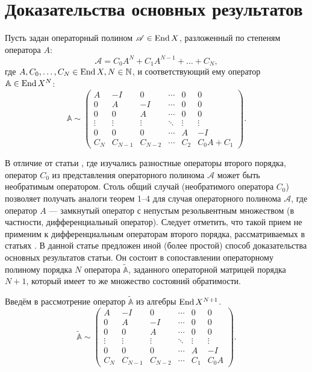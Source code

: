 \section{Доказательства основных результатов}
Пусть задан операторный полином $ \mathcal A \in \operatorname{End} X$, разложенный по степеням оператора $A$:
\[  \mathcal A = C_0 A^N + C_1 A^{N - 1} + \dotsc + C_N, \]
где $A, C_0, \dotsc, C_N \in \operatorname{End} X, N \in \mathbb{N}$, и соответствующий ему оператор $\mathbb A \in \operatorname{End}{X^N}$:
\[ \mathbb A \sim \begin{pmatrix}
    A & -I & 0  & \cdots & 0 & 0 \\
    0 & A  & -I & \cdots & 0 & 0 \\
    0 & 0  & A & \cdots & 0 & 0 \\
    \vdots & \vdots & \vdots & \ddots & \vdots & \vdots \\
    0 & 0 & 0 & \cdots & A & -I \\
    C_N & C_{N-1} & C_{N-2} & \cdots & C_2 & C_0 A + C_1
   \end{pmatrix}. \]

В отличие от статьи \cite{BasDup15}, где изучались разностные операторы второго порядка,
оператор $C_0$ из представления операторного полинома $\mathcal A$ может быть необратимым
оператором. Столь общий случай (необратимого оператора $C_0$) позволяет получать
аналоги теорем 1--4 для случая операторного полинома $\mathcal A$, где оператор $A$ ---
замкнутый оператор с непустым резольвентным множеством (в частности,
дифференциальный оператор). Следует отметить, что такой прием не применим к дифференциальным операторам второго порядка, рассматриваемых в статьях \cite{shkalikov,HryShk03}. В данной статье предложен иной (более простой)
способ доказательства основных результатов статьи. Он состоит в сопоставлении
операторному полиному порядка $N$ оператора $\widetilde{\mathbb A}$, заданного операторной матрицей порядка $N+1$, который имеет то же множество состояний обратимости.

Введём в рассмотрение оператор $\widetilde{\mathbb A}$ из алгебры $\operatorname{End}{X^{N+1}}$.
\[ \widetilde{\mathbb A} \sim \begin{pmatrix}
    A & -I & 0  & \cdots & 0 & 0 \\
    0 & A  & -I & \cdots & 0 & 0 \\
    0 & 0  & A & \cdots & 0 & 0 \\
    \vdots & \vdots & \vdots & \ddots & \vdots & \vdots \\
    0 & 0 & 0 & \cdots & A & -I \\
    C_N & C_{N-1} & C_{N-2} & \cdots & C_1 & C_0 A
   \end{pmatrix}. \]

